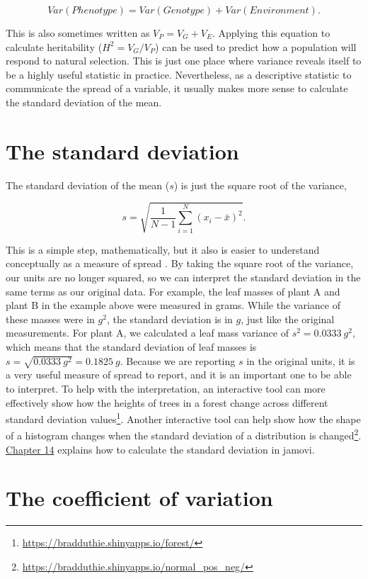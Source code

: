 \documentclass[
  openany]{scrbook}
\begin{document}
\[Var(Phenotype) = Var(Genotype) + Var(Environment).\]

This is also sometimes written as \(V_{P} = V_{G} + V_{E}\).
Applying this equation to calculate heritability (\(H^{2} = V_{G} / V_{P}\)) can be used to predict how a population will respond to natural selection.
This is just one place where variance reveals itself to be a highly useful statistic in practice.
Nevertheless, as a descriptive statistic to communicate the spread of a variable, it usually makes more sense to calculate the standard deviation of the mean.

\hypertarget{the-standard-deviation}{%
\section{The standard deviation}\label{the-standard-deviation}}

The standard deviation of the mean (\(s\)) is just the square root of the variance,

\[s = \sqrt{\frac{1}{N - 1}\sum_{i = 1}^{N}\left(x_{i} - \bar{x} \right)^{2}}.\]

This is a simple step, mathematically, but it also is easier to understand conceptually as a measure of spread \citep{Navarro2022}.
By taking the square root of the variance, our units are no longer squared, so we can interpret the standard deviation in the same terms as our original data.
For example, the leaf masses of plant A and plant B in the example above were measured in grams.
While the variance of these masses were in \(g^{2}\), the standard deviation is in \(g\), just like the original measurements.
For plant A, we calculated a leaf mass variance of \(s^{2} = 0.0333\:g^{2}\), which means that the standard deviation of leaf masses is \(s = \sqrt{0.0333\:g^{2}} = 0.1825\:g\).
Because we are reporting \(s\) in the original units, it is a very useful measure of spread to report, and it is an important one to be able to interpret.
To help with the interpretation, an interactive tool can more effectively show how the heights of trees in a forest change across different standard deviation values\footnote{\url{https://bradduthie.shinyapps.io/forest/}}.
Another interactive tool can help show how the shape of a histogram changes when the standard deviation of a distribution is changed\footnote{\url{https://bradduthie.shinyapps.io/normal_pos_neg/}}.
\protect\hyperlink{Chapter_14}{Chapter 14} explains how to calculate the standard deviation in jamovi.

\hypertarget{the-coefficient-of-variation}{%
\section{The coefficient of variation}\label{the-coefficient-of-variation}}
\end{document}
